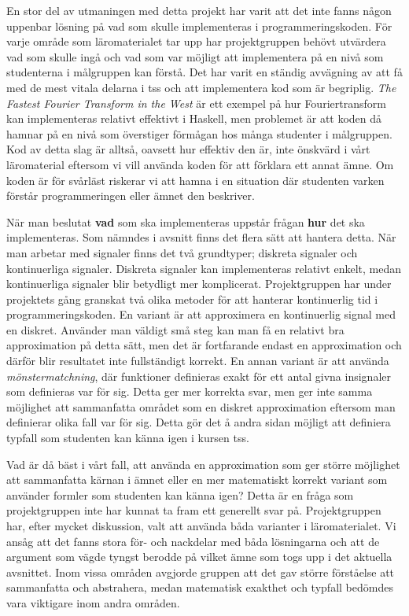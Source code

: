\documentclass[12pt,a4paper,twoside,openright]{article}
\begin{document}
En stor del av utmaningen med detta projekt har varit att det inte
fanns någon uppenbar lösning på vad som skulle implementeras i
programmeringskoden. För varje område som läromaterialet tar upp har
projektgruppen behövt utvärdera vad som skulle ingå och vad som var
möjligt att implementera på en nivå som studenterna i målgruppen kan
förstå. Det har varit en ständig avvägning av att få med de mest
vitala delarna i \gls{tss} och att implementera kod som är
begriplig. \textit{The Fastest Fourier Transform in the West}
\cite{fastestfourier} är ett exempel på hur Fouriertransform kan
implementeras relativt effektivt i Haskell, men problemet är att koden
då hamnar på en nivå som överstiger förmågan hos många studenter i
målgruppen. Kod av detta slag är alltså, oavsett hur effektiv den är,
inte önskvärd i vårt läromaterial eftersom vi vill använda koden för
att förklara ett annat ämne. Om koden är för svårläst riskerar vi att
hamna i en situation där studenten varken förstår programmeringen
eller ämnet den beskriver.

När man beslutat \textbf{vad} som ska implementeras uppstår frågan
\textbf{hur} det ska implementeras. Som nämndes i avsnitt
 finns det flera sätt att hantera detta. När
man arbetar med signaler finns det två grundtyper; diskreta signaler
och kontinuerliga signaler. Diskreta signaler kan implementeras
relativt enkelt, medan kontinuerliga signaler blir betydligt mer
komplicerat. Projektgruppen har under projektets gång granskat två
olika metoder för att hanterar kontinuerlig tid i
programmeringskoden. En variant är att approximera en kontinuerlig
signal med en diskret. Använder man väldigt små steg kan man få en
relativt bra approximation på detta sätt, men det är fortfarande
endast en approximation och därför blir resultatet inte fullständigt
korrekt.
En annan variant är att använda \textit{mönstermatchning}, där
funktioner definieras exakt för ett antal givna insignaler som
definieras var för sig. Detta ger mer korrekta svar, men ger inte
samma möjlighet att sammanfatta
området som en diskret approximation eftersom man definierar olika
fall var för sig. Detta gör det å andra sidan möjligt att definiera
typfall som studenten kan känna igen i kursen \gls{tss}.

Vad är då bäst i vårt fall, att använda en approximation som ger
större möjlighet att %
sammanfatta kärnan i ämnet eller en mer matematiskt korrekt variant
som använder formler som studenten kan känna igen? Detta är en fråga
som projektgruppen inte har kunnat ta fram ett generellt svar
på. Projektgruppen har, efter mycket diskussion, valt att använda båda
varianter i läromaterialet. Vi ansåg att det fanns stora för- och
nackdelar med båda lösningarna och att de argument som vägde tyngst
berodde på vilket ämne som togs upp i det aktuella avsnittet. Inom
vissa områden avgjorde gruppen att det gav större förståelse att
sammanfatta och abstrahera, medan matematisk exakthet och typfall
bedömdes vara viktigare inom andra områden.
\end{document}
